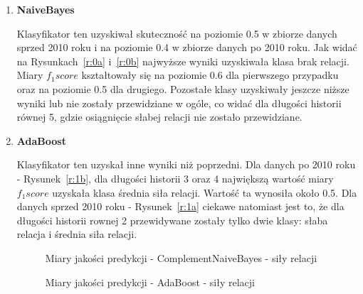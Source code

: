 \documentclass[polish,12pt]{aghthesis}
\begin{document}
\begin{enumerate}
    \item \textbf{NaiveBayes}
    
    Klasyfikator ten uzyskiwał skuteczność na poziomie 0.5 w zbiorze danych sprzed 2010 roku i na poziomie 0.4 w zbiorze danych po 2010 roku. Jak widać na Rysunkach~\ref{r:0a} i~\ref{r:0b} najwyższe wyniki uzyskiwała klasa brak relacji. Miary \textit{$f_1 score$} kształtowały się na poziomie 0.6 dla pierwszego przypadku oraz na poziomie 0.5 dla drugiego. Pozostałe klasy uzyskiwały jeszcze niższe wyniki lub nie zostały przewidziane w ogóle, co widać dla długości historii równej 5, gdzie osiągnięcie słabej relacji nie zostało przewidziane.
    
        \item \textbf{AdaBoost}
        
    Klasyfikator ten uzyskał inne wyniki niż poprzedni. Dla danych po 2010 roku - Rysunek~\ref{r:1b}, dla długości historii 3 oraz 4 największą wartość miary \textit{$f_1 score$} uzyskała klasa średnia siła relacji. Wartość ta wynosiła około 0.5. Dla danych sprzed 2010 roku - Rysunek~\ref{r:1a} ciekawe natomiast jest to, że dla długości historii rownej 2 przewidywane zostały tylko dwie klasy: słaba relacja i średnia siła relacji.
    
    
    \begin{figure}[ht] 
    \centering
    \hfill%
    \label{r:r1}
    \caption{Miary jakości predykcji - ComplementNaiveBayes - siły relacji}
    
\end{figure}
\FloatBarrier


    
            \begin{figure}[ht] 
    \centering
    \hfill%
    \label{r:r2}
    \caption{Miary jakości predykcji - AdaBoost - siły relacji}
    

\end{figure}
\end{enumerate}
\end{document}
